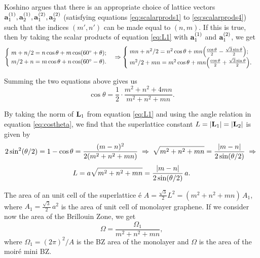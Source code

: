 \documentclass[12pt]{report}
\begin{document}
Koshino \cite{koshino2012} argues that there is an appropriate choice of lattice vectors $\vb{a}_1^{(1)}, \vb{a}_2^{(1)}, \vb{a}_1^{(2)}, \vb{a}_2^{(2)}$ (satisfying equations \ref{eq:scalarprods1} to \ref{eq:scalarprods4}) such that the indices $(m',n')$ can be made equal to $(n,m)$. If this is true, then by taking the scalar products of equation \ref{eq:L1} with $\vb{a}_1^{(1)}$ and $\vb{a}_1^{(2)}$, we get
$$
\begin{cases}
\; m + n/2 = n \cos\theta + m \cos(60^\circ + \theta); \\
\; m/2 + n = m \cos\theta + n \cos(60^\circ - \theta).
\end{cases}
\Rightarrow
\begin{cases}
\; mn + n^2/2 = n^2 \cos\theta + mn \qty(\frac{\cos\theta}{2}
- \frac{\sqrt{3} \sin\theta}{2}); \\
\; m^2/2 + mn = m^2 \cos\theta + mn \qty(\frac{\cos\theta}{2}
+ \frac{\sqrt{3} \sin\theta}{2}).
\end{cases}
$$

Summing the two equations above gives us
\begin{equation} \label{eq:costheta}
\boxed{\cos\theta = \frac{1}{2} \cdot \frac{m^2 + n^2 + 4mn}{m^2 + n^2 + mn}.}
\end{equation}



By taking the norm of $\vb{L}_1$ from equation \ref{eq:L1} and using the angle relation in equation \ref{eq:costheta}, we find that the superlattice constant $L = \abs{\vb{L}_1} = \abs{\vb{L}_2}$ is given by
$$
2\sin[2](\theta/2) = 1 - \cos\theta = \frac{(m-n)^2}{2(m^2+n^2+mn)} \; \Rightarrow \;
\sqrt{m^2+n^2+mn} = \frac{\abs{m-n}}{2\sin(\theta/2)} \; \Rightarrow \;
$$
\begin{equation} \label{eq:}
L = a\sqrt{m^2 + n^2 + mn} = \frac{\abs{m-n}}{2 \sin(\theta/2)} \, a.
\end{equation}

The area of an unit cell of the superlattice é $A = \frac{\sqrt{3}}{2} L^2 = (m^2 + n^2 + mn) \, A_1$, where $A_1 = \frac{\sqrt{3}}{2} \, a^2$ is the area of unit cell of monolayer graphene. If we consider now the area of the Brillouin Zone, we get
\begin{equation} \label{eq:bz-volume}
\Omega = \frac{\Omega_1}{m^2 + n^2 + mn},
\end{equation}
where $\Omega_1 = (2\pi)^2/A$ is the BZ area of the monolayer and $\Omega$ is the area of the moiré mini BZ.
\end{document}
